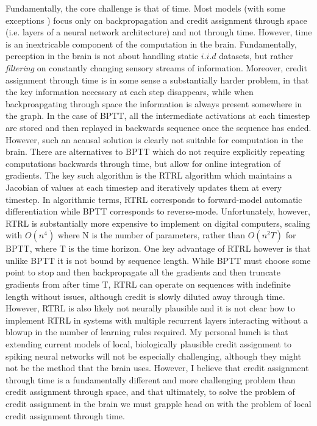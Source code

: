 Fundamentally, the core challenge is that of time. Most models (with some exceptions \citep{bellec2020solution,schiess2016somato}) focus only on backpropagation and credit assignment through space (i.e. layers of a neural network architecture) and not through time. However, time is an inextricable component of the computation in the brain. Fundamentally, perception in the brain is not about handling static $i.i.d$ datasets, but rather \emph{filtering} on constantly changing sensory streams of information. Moreover, credit assignment through time is in some sense a substantially harder problem, in that the key information necessary at each step disappears, while when backproapgating through space the information is always present somewhere in the graph. In the case of BPTT, all the intermediate activations at each timestep are stored and then replayed in backwards sequence once the sequence has ended. However, such an acausal solution is clearly not suitable for computation in the brain. There are alternatives to BPTT which do not require explicitly repeating computations backwards through time, but allow for online integration of gradients. The key such algorithm is the RTRL algorithm which maintains a Jacobian of values at each timestep and iteratively updates them at every timestep. In algorithmic terms, RTRL corresponds to forward-model automatic differentiation while BPTT corresponds to reverse-mode. Unfortunately, however, RTRL is substantially more expensive to implement on digital computers, scaling with $O(n^4)$ where N is the number of parameters, rather than $O(n^2T)$ for BPTT, where T is the time horizon. One key advantage of RTRL however is that unlike BPTT it is not bound by sequence length. While BPTT must choose some point to stop and then backpropagate all the gradients and then truncate gradients from after time T, RTRL can operate on sequences with indefinite length without issues, although credit is slowly diluted away through time. However, RTRL is also likely not neurally plausible and it is not clear how to implement RTRL in systems with multiple recurrent layers interacting without a blowup in the number of learning rules required. My personal hunch is that extending current models of local, biologically plausible credit assignment to spiking neural networks will not be especially challenging, although they might not be the method that the brain uses. However, I believe that credit assignment through time is a fundamentally different and more challenging problem than credit assignment through space, and that ultimately, to solve the problem of credit assignment in the brain we must grapple head on with the problem of local credit assignment through time. 

